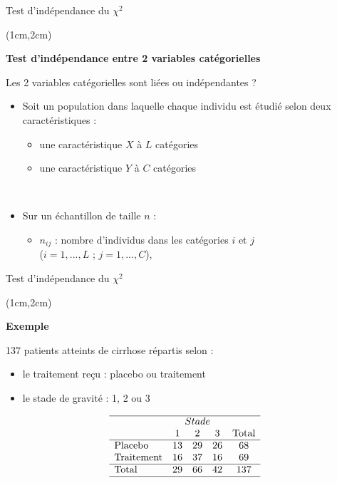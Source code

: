 \documentclass{beamer}
\begin{document}
\begin{frame}{Test d'indépendance du $\chi^2$}
\begin{textblock*}{\textwidth}(1cm,2cm)

\begin{center}{\bf \Large Test d'indépendance entre 2 variables catégorielles} \end{center}
\begin{center}
Les 2 variables catégorielles sont liées ou indépendantes ? 
\end{center}

\begin{itemize}
\item Soit un population dans laquelle chaque individu est étudié selon deux caractéristiques : 
\begin{itemize}
\item une caractéristique $X$ à $L$ catégories 
\item une caractéristique $Y$ à $C$ catégories 
\end{itemize}

\

\item Sur un échantillon de taille $n$ : 
\begin{itemize}
\item $n_{ij}$ : nombre d'individus dans les catégories $i$ et $j$ \\
($i=1,..., L$ ; $j=1,..., C$),
\end{itemize}
\end{itemize}
\end{textblock*}

\end{frame}

\begin{frame}{Test d'indépendance du $\chi^2$}
\begin{textblock*}{\textwidth}(1cm,2cm)

\begin{center}{\bf Exemple} \end{center}
\vspace{0.2cm}
137 patients atteints de cirrhose répartis selon : 
\begin{itemize}
\item le traitement reçu : placebo ou  traitement
\item le stade de gravité : 1, 2 ou 3
\end{itemize}

\small
$$
\begin{array}{lcccc}
\hline 
& \multicolumn{3}{c}{Stade} \\
& 1 & 2 & 3 & \mbox{Total} \\
\hline
\mbox{Placebo} & 13 & 29 & 26 & 68 \\
\mbox{Traitement} & 16 & 37 & 16 & 69 \\
\hline 
\mbox{Total} & 29 & 66 & 42 & 137 \\
\hline
\end{array}
$$
\end{textblock*}

\end{frame}
\end{document}
